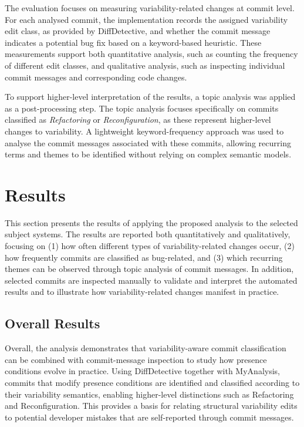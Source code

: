 The evaluation focuses on measuring variability-related changes at commit level. For each analysed commit, the implementation records the assigned variability edit class, as provided by DiffDetective, and whether the commit message indicates a potential bug fix based on a keyword-based heuristic. These measurements support both quantitative analysis, such as counting the frequency of different edit classes, and qualitative analysis, such as inspecting individual commit messages and corresponding code changes. 
 
To support higher-level interpretation of the results, a topic analysis was applied as a post-processing step. The topic analysis focuses specifically on commits classified as \emph{Refactoring} or \emph{Reconfiguration}, as these represent higher-level changes to variability. A lightweight keyword-frequency approach was used to analyse the commit messages associated with these commits, allowing recurring terms and themes to be identified without relying on complex semantic models. 
\section{Results}
This section presents the results of applying the proposed analysis to the selected subject systems. 
The results are reported both quantitatively and qualitatively, focusing on 
(1) how often different types of variability-related changes occur, 
(2) how frequently commits are classified as bug-related, and 
(3) which recurring themes can be observed through topic analysis of commit messages. 
In addition, selected commits are inspected manually to validate and interpret the automated results 
and to illustrate how variability-related changes manifest in practice.

\subsection{Overall Results}

Overall, the analysis demonstrates that variability-aware commit classification can be combined with commit-message inspection to study how presence conditions evolve in practice. Using DiffDetective together with MyAnalysis, commits that modify presence conditions are identified and classified according to their variability semantics, enabling higher-level distinctions such as Refactoring and Reconfiguration. This provides a basis for relating structural variability edits to potential developer mistakes that are self-reported through commit messages.

